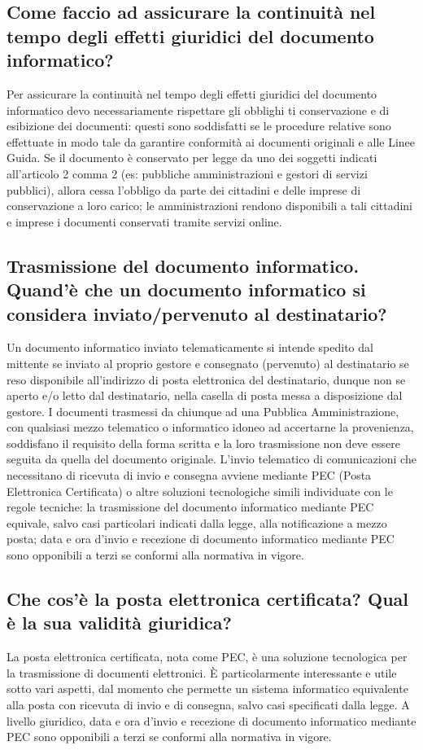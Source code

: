 \subsection{Come faccio ad assicurare la continuità nel tempo degli effetti giuridici del documento informatico?}
Per assicurare la continuità nel tempo degli effetti giuridici del documento informatico
devo necessariamente rispettare gli obblighi ti conservazione e di esibizione dei documenti:
questi sono soddisfatti se le procedure relative sono effettuate in modo tale da garantire
conformità ai documenti originali e alle Linee Guida.
\newline
Se il documento è conservato per legge da uno dei soggetti indicati all’articolo 2
comma 2 (es: pubbliche amministrazioni e gestori di servizi pubblici), allora cessa l’obbligo
da parte dei cittadini e delle imprese di conservazione a loro carico; le amministrazioni
rendono disponibili a tali cittadini e imprese i documenti conservati tramite servizi online.

\subsection{Trasmissione del documento informatico. Quand'è che un documento informatico si considera inviato/pervenuto al destinatario?}
Un documento informatico inviato telematicamente si intende spedito dal mittente
se inviato al proprio gestore e consegnato (pervenuto) al destinatario se reso disponibile
all’indirizzo di posta elettronica del destinatario, dunque non se aperto e/o letto dal destinatario,
nella casella di posta messa a disposizione dal gestore. I documenti trasmessi da chiunque
ad una Pubblica Amministrazione, con qualsiasi mezzo telematico o informatico idoneo ad accertarne la provenienza,
soddisfano il requisito della forma scritta e la loro trasmissione non deve essere seguita
da quella del documento originale. L’invio telematico di comunicazioni che necessitano di
ricevuta di invio e consegna avviene mediante PEC (Posta Elettronica Certificata)
o altre soluzioni tecnologiche simili individuate con le regole tecniche:
la trasmissione del documento informatico mediante PEC equivale,
salvo casi particolari indicati dalla legge, alla notificazione a mezzo posta;
data e ora d’invio e recezione di documento informatico mediante PEC sono opponibili a terzi se conformi alla normativa in vigore.

\subsection{Che cos'è la posta elettronica certificata? Qual è la sua validità giuridica?}
La posta elettronica certificata, nota come PEC, è una soluzione tecnologica per
la trasmissione di documenti elettronici.
È particolarmente interessante e utile sotto vari aspetti, dal momento che
permette un sistema informatico equivalente alla posta con ricevuta di invio e di consegna,
salvo casi specificati dalla legge. A livello giuridico, data e ora d’invio e recezione
di documento informatico mediante PEC sono opponibili a terzi se conformi alla normativa in vigore.

